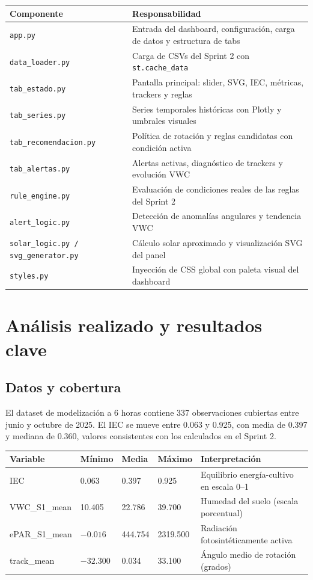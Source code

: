 \documentclass[11pt,a4paper]{article}
\begin{document}
\begin{longtable}{p{} p{}}
\textbf{Componente} & \textbf{Responsabilidad} \\
\hline
\texttt{app.py} & Entrada del dashboard, configuración, carga de datos y estructura de tabs \\
\texttt{data\_loader.py} & Carga de CSVs del Sprint 2 con \texttt{st.cache\_data} \\
\texttt{tab\_estado.py} & Pantalla principal: slider, SVG, IEC, métricas, trackers y reglas \\
\texttt{tab\_series.py} & Series temporales históricas con Plotly y umbrales visuales \\
\texttt{tab\_recomendacion.py} & Política de rotación y reglas candidatas con condición activa \\
\texttt{tab\_alertas.py} & Alertas activas, diagnóstico de trackers y evolución VWC \\
\texttt{rule\_engine.py} & Evaluación de condiciones reales de las reglas del Sprint 2 \\
\texttt{alert\_logic.py} & Detección de anomalías angulares y tendencia VWC \\
\texttt{solar\_logic.py / svg\_generator.py} & Cálculo solar aproximado y visualización SVG del panel \\
\texttt{styles.py} & Inyección de CSS global con paleta visual del dashboard \\
\end{longtable}

\section{Análisis realizado y resultados clave}

\subsection{Datos y cobertura}

El dataset de modelización a 6 horas contiene 337 observaciones cubiertas entre junio y
octubre de 2025. El IEC se mueve entre 0.063 y 0.925, con media de 0.397 y mediana de
0.360, valores consistentes con los calculados en el Sprint 2.

\begin{longtable}{p{} p{} p{} p{} p{}}
\textbf{Variable} & \textbf{Mínimo} & \textbf{Media} & \textbf{Máximo} & \textbf{Interpretación} \\
\hline
IEC                & 0.063 & 0.397 & 0.925 & Equilibrio energía-cultivo en escala 0–1 \\
VWC\_S1\_mean      & 10.405 & 22.786 & 39.700 & Humedad del suelo (escala porcentual) \\
ePAR\_S1\_mean     & $-0.016$ & 444.754 & 2319.500 & Radiación fotosintéticamente activa \\
track\_mean        & $-32.300$ & 0.034 & 33.100 & Ángulo medio de rotación (grados) \\
\end{longtable}
\end{document}
